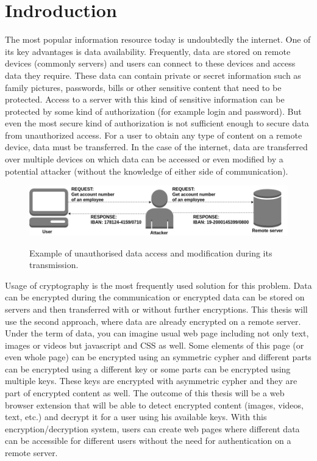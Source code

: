 \chapter{Indroduction}
The most popular information resource today is undoubtedly the internet. One of its key advantages is data availability. Frequently, data are stored on remote devices (commonly servers) and users can connect to these devices and access data they require. These data can contain private or secret information such as family pictures, passwords, bills or other sensitive content that need to be protected. Access to a server with this kind of sensitive information can be protected by some kind of authorization (for example login and password). But even the most secure kind of authorization is not sufficient enough to secure data from unauthorized access. For a user to obtain any type of content on a remote device, data must be transferred. In the case of the internet, data are transferred over multiple devices on which data can be accessed or even modified by a potential attacker (without the knowledge of either side of communication).

\begin{figure}[H]
    \begin{center}
        \label{img:unsecureconnection}
        \includegraphics[width=1.0\textwidth]{obrazky-figures/unsecureconnection.png}
        \caption{Example of unauthorised data access and modification during its transmission.}
    \end{center}
\end{figure}

Usage of cryptography is the most frequently used solution for this problem. Data can be encrypted during the communication or encrypted data can be stored on servers and then transferred with or without further encryptions. This thesis will use the second approach, where data are already encrypted on a remote server. Under the term of data, you can imagine usual web page including not only text, images or videos but javascript and CSS as well. Some elements of this page (or even whole page) can be encrypted using an symmetric cypher and different parts can be encrypted using a different key or some parts can be encrypted using multiple keys. These keys are encrypted with asymmetric cypher and they are part of encrypted content as well. The outcome of this thesis will be a web browser extension that will be able to detect encrypted content (images, videos, text, etc.) and decrypt it for a user using his available keys. With this encryption/decryption system, users can create web pages where different data can be accessible for different users without the need for authentication on a remote server.


